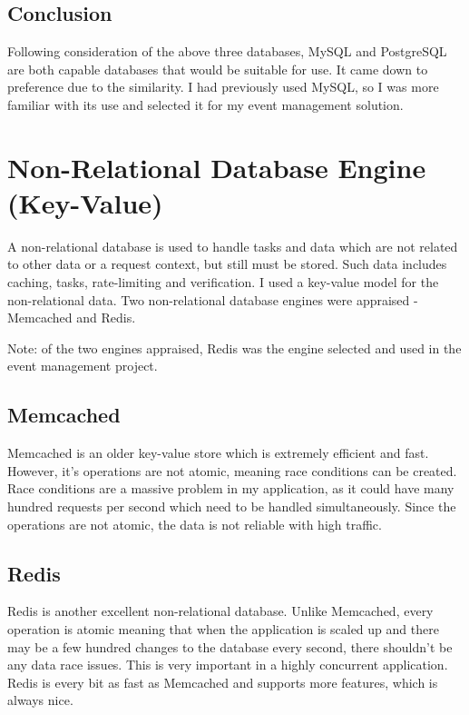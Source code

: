 \documentclass[a4paper,oneside,12pt]{report}
\begin{document}
	\subsection{Conclusion}
	Following consideration of the above three databases, MySQL and PostgreSQL are both capable databases that would be suitable for use. It came down to preference due to the similarity. I had previously used MySQL, so I was more familiar with its use and selected it for my event management solution.

	\section{Non-Relational Database Engine (Key-Value)}
	A non-relational database is used to handle tasks and data which are not related to other data or a request context, but still must be stored. Such data includes caching, tasks, rate-limiting and verification. I used a key-value model for the non-relational data. Two non-relational database engines were appraised - Memcached and Redis.
	
	\begin{framed}
	Note: of the two engines appraised, Redis was the engine selected and used in the event management project.
	\end{framed}

	\subsection{Memcached}
	Memcached is an older key-value store which is extremely efficient and fast. However, it’s operations are not atomic, meaning race conditions can be created. Race conditions are a massive problem in my application, as it could have many hundred requests per second which need to be handled simultaneously. Since the operations are not atomic, the data is not reliable with high traffic.

	\subsection{Redis}
	Redis is another excellent non-relational database. Unlike Memcached, every operation is atomic meaning that when the application is scaled up and there may be a few hundred changes to the database every second, there shouldn't be any data race issues. This is very important in a highly concurrent application. Redis is every bit as fast as Memcached and supports more features, which is always nice.
\end{document}
